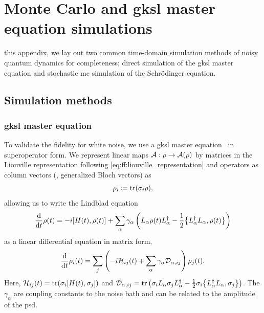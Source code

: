 \chapter{Monte Carlo and \texorpdfstring{\acrshort{gksl}}{GKSL} master equation simulations}\label{ch:app:ff:time_domain_methods}
 this appendix, we lay out two common time-domain simulation methods of noisy quantum dynamics for completeness; direct simulation of the \gls{gksl} master equation and stochastic \gls{mc} simulation of the Schrödinger equation.

\section{Simulation methods}\label{sec:app:ff:time_domain_methods}
\subsection{\texorpdfstring{\acrshort{gksl}}{GKSL} master equation}\label{subsec:app:ff:time_domain_methods:gksl}
To validate the fidelity for white noise, we use a \gls{gksl} master equation~\cite{Lindblad1976,Gorini1976} in superoperator form.
We represent linear maps $\mathcal{A}: \rho\rightarrow\mathcal{A}(\rho)$ by matrices in the Liouville representation following \cref{eq:ff:liouville_representation}
and operators as column vectors (\ie, generalized Bloch vectors) as
\begin{equation}\label{eq:app:ff:bloch_vector}
    \rho_i \coloneqq \tr(\sigma_i\rho),
\end{equation}
allowing us to write the Lindblad equation
\begin{equation}\label{eq:app:ff:lindblad:hilbert}
    \dv{t}\rho(t) = -\i\comm{H(t)}{\rho(t)} + \sum_\alpha \gamma_\alpha\left(L_\alpha\rho(t) L_\alpha\adjoint - \frac{1}{2}\acomm{L_\alpha\adjoint L_\alpha}{\rho(t)}\right)
\end{equation}
as a linear differential equation in matrix form,
\begin{equation}\label{eq:app:ff:lindlbad:liouville}
    \dv{t}\rho_i(t) = \sum_j\left(-i\mathcal{H}_{ij}(t)+ \sum_\alpha \gamma_\alpha \mathcal{D}_{\alpha, ij}\right)\rho_j(t).
\end{equation}
Here, $\mc{H}_{ij}(t) = \tr(\sigma_i\comm{H(t)}{\sigma_j})$ and $\mc{D}_{\alpha, ij} = \tr\left(\sigma_i L_\alpha\sigma_j L_\alpha\adjoint - \frac{1}{2}\sigma_i \acomm{L_\alpha\adjoint L_\alpha}{\sigma_j}\right)$.
The $\gamma_\alpha$ are coupling constants to the noise bath and can be related to the amplitude of the \gls{psd}.

